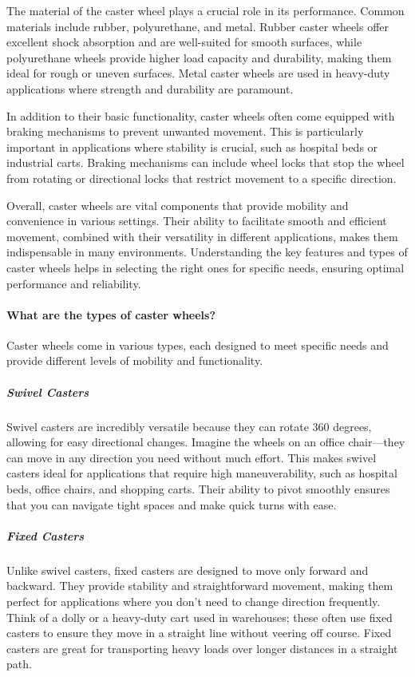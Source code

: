 \documentclass[../../main]{subfiles}
\begin{document}
The material of the caster wheel plays a crucial role in its performance. Common materials include rubber, polyurethane, and metal. Rubber caster wheels offer excellent shock absorption and are well-suited for smooth surfaces, while polyurethane wheels provide higher load capacity and durability, making them ideal for rough or uneven surfaces. Metal caster wheels are used in heavy-duty applications where strength and durability are paramount.

In addition to their basic functionality, caster wheels often come equipped with braking mechanisms to prevent unwanted movement. This is particularly important in applications where stability is crucial, such as hospital beds or industrial carts. Braking mechanisms can include wheel locks that stop the wheel from rotating or directional locks that restrict movement to a specific direction.

Overall, caster wheels are vital components that provide mobility and convenience in various settings. Their ability to facilitate smooth and efficient movement, combined with their versatility in different applications, makes them indispensable in many environments. Understanding the key features and types of caster wheels helps in selecting the right ones for specific needs, ensuring optimal performance and reliability.

\paragraph{What are the types of caster wheels?}
Caster wheels come in various types, each designed to meet specific needs and provide different levels of mobility and functionality.
\subparagraph{Swivel Casters} 
Swivel casters are incredibly versatile because they can rotate 360 degrees, allowing for easy directional changes. Imagine the wheels on an office chair—they can move in any direction you need without much effort. This makes swivel casters ideal for applications that require high maneuverability, such as hospital beds, office chairs, and shopping carts. Their ability to pivot smoothly ensures that you can navigate tight spaces and make quick turns with ease.

\subparagraph{Fixed Casters}
Unlike swivel casters, fixed casters are designed to move only forward and backward. They provide stability and straightforward movement, making them perfect for applications where you don't need to change direction frequently. Think of a dolly or a heavy-duty cart used in warehouses; these often use fixed casters to ensure they move in a straight line without veering off course. Fixed casters are great for transporting heavy loads over longer distances in a straight path.
\end{document}
